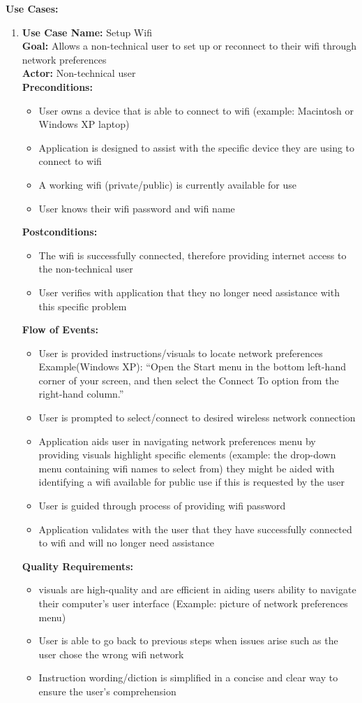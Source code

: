 \documentclass[12pt, letterpaper]{article}
\begin{document}
	\textbf{Use Cases:}
	
\begin{enumerate}
	\item \textbf{Use Case Name:} Setup Wifi
	\\\textbf{Goal:} Allows a non-technical user to set up or reconnect to their wifi through network preferences
	\\\textbf{Actor:} Non-technical user
	\\\textbf{Preconditions:}
	\begin{itemize}
		\item User owns a device that is able to connect to wifi (example: Macintosh or Windows XP laptop)
		\item Application is designed to assist with the specific device they are using to connect to wifi
		\item A working wifi (private/public) is currently available for use 
		\item User knows their wifi password and wifi name
	\end{itemize}
	\textbf{Postconditions:}
	\begin{itemize}
		\item The wifi is successfully connected, therefore providing internet access to the non-technical user
		\item User verifies with application that they no longer need assistance with this specific problem 
	\end{itemize}
	\textbf{Flow of Events:}
	\begin{itemize}
		\item User is provided instructions/visuals to locate network preferences 
		Example(Windows XP): “Open the Start menu in the bottom left-hand corner of your screen, and then select the Connect To option from the right-hand column.”
		\item User is prompted to select/connect to desired wireless network connection 
		\item Application aids user in navigating network preferences menu by providing visuals highlight specific elements (example: the drop-down menu containing wifi names to select from)
		they might be aided with identifying a wifi available for public use if this is requested by the user
		\item User is guided through process of providing wifi password 
		\item Application validates with the user that they have successfully connected to wifi and will no longer need assistance
	\end{itemize}
	\textbf{Quality Requirements:}
	\begin{itemize}
		\item visuals are high-quality and are efficient in aiding users ability to navigate their computer’s user interface (Example: picture of network preferences menu)
		\item User is able to go back to previous steps when issues arise such as the user chose the wrong wifi network
		\item Instruction wording/diction is simplified in a concise and clear way to ensure the user’s comprehension 
	\end{itemize}


\end{enumerate}
\end{document}
